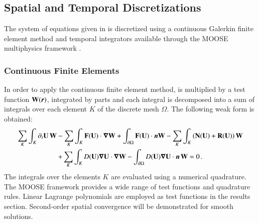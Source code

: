 \documentclass[preprint,10pt]{elsarticle}
\begin{document}
\subsection{Spatial and Temporal Discretizations} \label{sec:spatial-disc}
%
The system of equations given in  is discretized using a continuous Galerkin finite element 
method and temporal integrators available through the MOOSE multiphysics framework \cite{Moose2009}.
%
\subsubsection{Continuous Finite Elements} 
%
In order to apply the continuous finite element method,  is multiplied by a test function 
$\mathbf W(\boldsymbol r)$, integrated by parts and each integral is decomposed into a sum of integrals over 
each element $K$ of the discrete mesh $\Omega$. The following weak form is obtained:
%
\begin{multline}\label{eq:cfem}
\sum_K \int_{K} \partial_t \mathbf U \, \mathbf W - \sum_K \int_{K} \mathbf F (\mathbf U) \cdot \boldsymbol\nabla \mathbf W + \int_{\partial \Omega} \mathbf F (\mathbf U) 
\cdot \boldsymbol n \mathbf W - \sum_K \int_{K} \left( \mathbf N (\mathbf U) + \mathbf R (\mathbf U) \right) \mathbf W  \\
+ \sum_K \int_{K} D(\mathbf U) \boldsymbol\nabla \mathbf U \cdot \boldsymbol\nabla \mathbf W 
- \int_{\partial \Omega} D(\mathbf U) \boldsymbol\nabla \mathbf U \cdot \boldsymbol n \, \mathbf W = 0 \,.
\end{multline}
%
The integrals over the elements $K$ are evaluated using a numerical quadrature. The MOOSE framework 
provides a wide range of test functions and quadrature rules. Linear Lagrange polynomials are employed 
as test functions in the results section. Second-order spatial convergence will be demonstrated for smooth solutions. 
%
\end{document}
